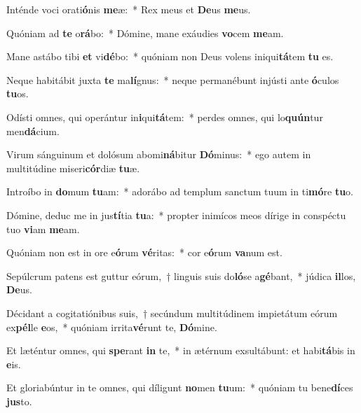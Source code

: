\item Inténde voci orati\textbf{ó}nis \textbf{me}æ:~* Rex meus et \textbf{De}us \textbf{me}us.

\item Quóniam ad \textbf{te} o\textbf{rá}bo:~* Dómine, mane exáudies \textbf{vo}cem \textbf{me}am.

\item Mane astábo tibi \textbf{et} vi\textbf{dé}bo:~* quóniam non Deus volens iniqui\textbf{tá}tem \textbf{tu} es.

\item Neque habitábit juxta \textbf{te} ma\textbf{lí}gnus:~* neque permanébunt injústi ante \textbf{ó}culos \textbf{tu}os.

\item Odísti omnes, qui operántur in\textbf{i}qui\textbf{tá}tem:~* perdes omnes, qui lo\textbf{quún}tur men\textbf{dá}cium.

\item Virum sánguinum et dolósum abomi\textbf{ná}bitur \textbf{Dó}minus:~* ego autem in multitúdine miseri\textbf{cór}diæ \textbf{tu}æ.

\item Introíbo in \textbf{do}mum \textbf{tu}am:~* adorábo ad templum sanctum tuum in ti\textbf{mó}re \textbf{tu}o.

\item Dómine, deduc me in jus\textbf{tí}tia \textbf{tu}a:~* propter inimícos meos dírige in conspéctu tuo \textbf{vi}am \textbf{me}am.

\item Quóniam non est in ore e\textbf{ó}rum \textbf{vé}ritas:~* cor e\textbf{ó}rum \textbf{va}num est.

\item Sepúlcrum patens est guttur eórum,~† linguis suis do\textbf{ló}se a\textbf{gé}bant,~* júdica \textbf{il}los, \textbf{De}us.

\item Décidant a cogitatiónibus suis,~† secúndum multitúdinem impietátum eórum ex\textbf{pél}le \textbf{e}os,~* quóniam irrita\textbf{vé}runt te, \textbf{Dó}mine.

\item Et læténtur omnes, qui \textbf{spe}rant \textbf{in} te,~* in ætérnum exsultábunt: et habi\textbf{tá}bis in \textbf{e}is.

\item Et gloriabúntur in te omnes, qui díligunt \textbf{no}men \textbf{tu}um:~* quóniam tu bene\textbf{dí}ces \textbf{jus}to.